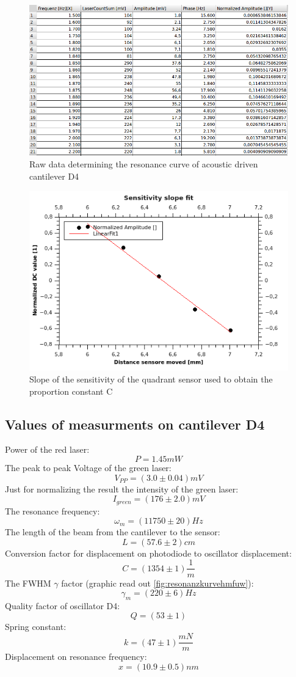 \documentclass[12pt,a4paper]{article}
\begin{document}
\begin{figure}[H]
	\centering
	\includegraphics[scale=0.6]{../figures/rohdaten.png}
	\caption{Raw data determining the resonance curve of acoustic driven cantilever D4}
	\label{fig:resonanzkurvedata}
\end{figure}


\begin{figure}[H]
	\centering
	\includegraphics[scale=2]{../figures/Slopeofsensitivityofthesensor.png}
	\caption{Slope of the sensitivity of the quadrant sensor used to obtain the proportion constant C}
	\label{fig:sensorsensitivity}
\end{figure}

\noindent
\subsection{Values of measurments on cantilever D4}
\label{label:values}
Power of the red laser:
$$P = 1.45mW$$
The peak to peak Voltage of the green laser:
$$V_{PP} = (3.0 \pm 0.04)mV$$ 
Just for normalizing the result the intensity of the green laser:
$$I_{green} = (176 \pm 2.0) mV$$
The resonance frequency:
$$\omega_m = (11750 \pm 20) Hz$$
The length of the beam from the cantilever to the sensor:
$$L = (57.6 \pm 2)cm$$
Conversion factor for displacement on photodiode to oscillator displacement:
$$C = (1354 \pm 1) \frac{1}{m}$$ 
The FWHM $\gamma$ factor (graphic read out \ref{fig:resonanzkurvehmfuw}):
$$\gamma_m = (220 \pm 6) Hz$$
Quality factor of oscillator D4:
$$Q = (53 \pm 1)$$
Spring constant:
$$k = (47 \pm 1) \frac{mN}{m}$$
Displacement on resonance frequency:
$$x = (10.9 \pm 0.5) nm$$
\end{document}
